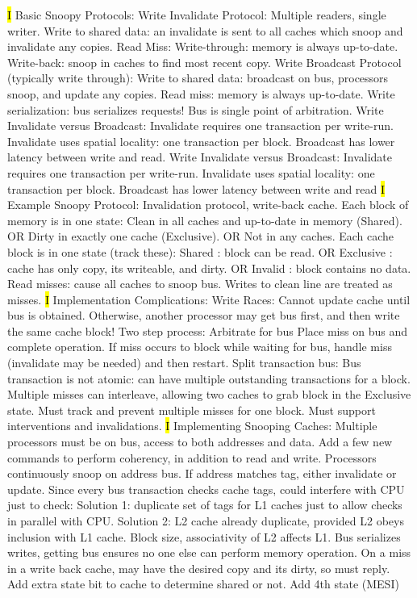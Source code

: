 \documentclass[fontsize=4pt]{scrartcl}
\begin{document}
\hl{I}
Basic Snoopy Protocols: Write Invalidate Protocol: Multiple readers, single writer. Write to shared data:  an invalidate is sent to all caches which snoop and invalidate any copies. Read Miss: Write-through: memory is always up-to-date. Write-back: snoop in caches to find most recent copy. Write Broadcast Protocol (typically write through): Write to shared data: broadcast on bus, processors snoop, and update any copies. Read miss: memory is always up-to-date. Write serialization: bus serializes requests! Bus is single point of arbitration. Write Invalidate versus Broadcast: Invalidate requires one transaction per write-run. Invalidate uses spatial locality: one transaction per block. Broadcast has lower latency between write and read. Write Invalidate versus Broadcast: Invalidate requires one transaction per write-run. Invalidate uses spatial locality: one transaction per block. Broadcast has lower latency between write and read
\hl{I}
Example Snoopy Protocol: Invalidation protocol, write-back cache. Each block of memory is in one state: Clean in all caches and up-to-date in memory (Shared). OR Dirty in exactly one cache (Exclusive). OR Not in any caches. Each cache block is in one state (track these): Shared : block can be read. OR Exclusive : cache has only copy, its writeable, and dirty. OR Invalid : block contains no data. Read misses: cause all caches to snoop bus. Writes to clean line are treated as misses.
\hl{I}
Implementation Complications: Write Races: Cannot update cache until bus is obtained. Otherwise, another processor may get bus first, and then write the same cache block! Two step process: Arbitrate for bus Place miss on bus and complete operation. If miss occurs to block while waiting for bus, handle miss (invalidate may be needed) and then restart. Split transaction bus: Bus transaction is not atomic: can have multiple outstanding transactions for a block. Multiple misses can interleave, allowing two caches to grab block in the Exclusive state. Must track and prevent multiple misses for one block. Must support interventions and invalidations.
\hl{I}
Implementing Snooping Caches: Multiple processors must be on bus, access to both addresses and data. Add a few new commands to perform coherency, in addition to read and write. Processors continuously snoop on address bus. If address matches tag, either invalidate or update. Since every bus transaction checks cache tags, could interfere with CPU just to check: Solution 1: duplicate set of tags for L1 caches just to allow checks in parallel with CPU. Solution 2: L2 cache already duplicate, provided L2 obeys inclusion with L1 cache. Block size, associativity of L2 affects L1. Bus serializes writes, getting bus ensures no one else can perform memory operation. On a miss in a write back cache, may have the desired copy and its dirty, so must reply. Add extra state bit to cache to determine shared or not. Add 4th state (MESI)
\end{document}
